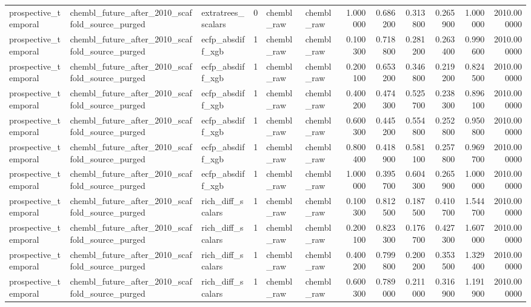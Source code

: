 \begin{longtable}{lllrllrrrrrr}
prospective\_temporal & chembl\_future\_after\_2010\_scaffold\_source\_purged & extratrees\_scalars & 0 & chembl\_raw & chembl\_raw & 1.000000 & 0.686200 & 0.313800 & 0.265900 & 1.000000 & 2010.000000 \\
prospective\_temporal & chembl\_future\_after\_2010\_scaffold\_source\_purged & ecfp\_absdiff\_xgb & 1 & chembl\_raw & chembl\_raw & 0.100300 & 0.718800 & 0.281200 & 0.263400 & 0.990600 & 2010.000000 \\
prospective\_temporal & chembl\_future\_after\_2010\_scaffold\_source\_purged & ecfp\_absdiff\_xgb & 1 & chembl\_raw & chembl\_raw & 0.200100 & 0.653200 & 0.346800 & 0.219200 & 0.824500 & 2010.000000 \\
prospective\_temporal & chembl\_future\_after\_2010\_scaffold\_source\_purged & ecfp\_absdiff\_xgb & 1 & chembl\_raw & chembl\_raw & 0.400200 & 0.474300 & 0.525700 & 0.238300 & 0.896100 & 2010.000000 \\
prospective\_temporal & chembl\_future\_after\_2010\_scaffold\_source\_purged & ecfp\_absdiff\_xgb & 1 & chembl\_raw & chembl\_raw & 0.600300 & 0.445200 & 0.554800 & 0.252800 & 0.950800 & 2010.000000 \\
prospective\_temporal & chembl\_future\_after\_2010\_scaffold\_source\_purged & ecfp\_absdiff\_xgb & 1 & chembl\_raw & chembl\_raw & 0.800400 & 0.418900 & 0.581100 & 0.257800 & 0.969700 & 2010.000000 \\
prospective\_temporal & chembl\_future\_after\_2010\_scaffold\_source\_purged & ecfp\_absdiff\_xgb & 1 & chembl\_raw & chembl\_raw & 1.000000 & 0.395700 & 0.604300 & 0.265900 & 1.000000 & 2010.000000 \\
prospective\_temporal & chembl\_future\_after\_2010\_scaffold\_source\_purged & rich\_diff\_scalars & 1 & chembl\_raw & chembl\_raw & 0.100300 & 0.812500 & 0.187500 & 0.410700 & 1.544700 & 2010.000000 \\
prospective\_temporal & chembl\_future\_after\_2010\_scaffold\_source\_purged & rich\_diff\_scalars & 1 & chembl\_raw & chembl\_raw & 0.200100 & 0.823300 & 0.176700 & 0.427300 & 1.607000 & 2010.000000 \\
prospective\_temporal & chembl\_future\_after\_2010\_scaffold\_source\_purged & rich\_diff\_scalars & 1 & chembl\_raw & chembl\_raw & 0.400200 & 0.799800 & 0.200200 & 0.353500 & 1.329400 & 2010.000000 \\
prospective\_temporal & chembl\_future\_after\_2010\_scaffold\_source\_purged & rich\_diff\_scalars & 1 & chembl\_raw & chembl\_raw & 0.600300 & 0.789000 & 0.211000 & 0.316900 & 1.191900 & 2010.000000 \\

\end{longtable}
